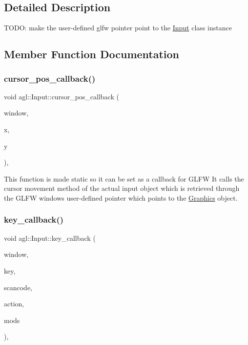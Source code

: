 \subsection{Detailed Description}
T\+O\+DO\+: make the user-\/defined glfw pointer point to the \mbox{\hyperlink{classagl_1_1Input}{Input}} class instance 

\subsection{Member Function Documentation}
\mbox{\label{classagl_1_1Input_a6273f37976797d2af6ffc3a004da75c9}} 
\subsubsection{\texorpdfstring{cursor\_pos\_callback()}{cursor\_pos\_callback()}}
{\footnotesize\ttfamily void agl\+::\+Input\+::cursor\+\_\+pos\+\_\+callback (\begin{DoxyParamCaption}\item[{G\+L\+F\+Wwindow $\ast$}]{window,  }\item[{double}]{x,  }\item[{double}]{y }\end{DoxyParamCaption})\hspace{0.3cm}{\ttfamily [static]}, {\ttfamily [private]}}

This function is made static so it can be set as a callback for G\+L\+FW It calls the cursor movement method of the actual input object which is retrieved through the G\+L\+FW window\textquotesingle{}s user-\/defined pointer which points to the \mbox{\hyperlink{classagl_1_1Graphics}{Graphics}} object. \mbox{\label{classagl_1_1Input_a32f796994b97888c46e5ad150a988370}} 
\subsubsection{\texorpdfstring{key\_callback()}{key\_callback()}}
{\footnotesize\ttfamily void agl\+::\+Input\+::key\+\_\+callback (\begin{DoxyParamCaption}\item[{G\+L\+F\+Wwindow $\ast$}]{window,  }\item[{int}]{key,  }\item[{int}]{scancode,  }\item[{int}]{action,  }\item[{int}]{mods }\end{DoxyParamCaption})\hspace{0.3cm}{\ttfamily [static]}, {\ttfamily [private]}}

